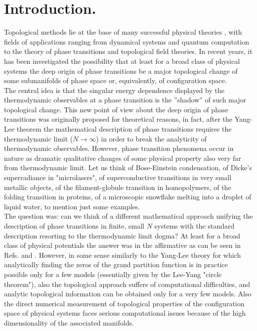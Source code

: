 \documentclass[preprintnumbers,showpacs, showkeys, twocolumn,secnumarabic,amssymb,amsmath,amsfonts,aps, pre]{revtex4-1}
\begin{document}
\section{Introduction. }
Topological methods lie at the base of many successful physical theories \cite{Nakahara}, with fields of applications ranging from dynamical systems and quantum computation to the theory of phase transitions and topological field theories. 
In recent years, it has been investigated \cite{PettiniBook} the possibility that at least for a broad class of physical systems the deep origin of phase transitions be a major topological change of some submanifolds of phase space or, equivalently, of configuration space. \\
The central idea is that the singular energy dependence displayed by the thermodynamic observables at a phase transition is the ”shadow” of such major topological change. 
This new point of view about 
the deep origin of phase transitions was originally proposed for theoretical reasons, in fact, after the Yang-Lee theorem the mathematical description of phase transitions requires the thermodynamic limit ($N\rightarrow\infty$) in order to break the analyticity of thermodynamic observables. However, phase transition phenomena occur in nature as dramatic qualitative changes of some physical property also very far from thermodynamic limit. Let us think of Bose-Einstein condensation, of Dicke's superradiance in "microlasers", of superconductive transitions in very small metallic objects, of the filament-globule transition in homopolymers, of the folding transition in proteins, of a microscopic snowflake melting into a droplet of liquid water, to mention just some examples. \\
The question was: can we think of a different mathematical approach unifying the description of phase transitions in finite, small $N$ systems with the standard description resorting to the thermodynamic limit dogma? At least for a broad class of physical potentials the answer was in the affirmative as can be seen in Refs.  \cite{PettiniBook}  and \cite{TH1,TH2}. 
However, in some sense similarly to the Yang-Lee theory for which analytically finding the zeros of the grand partition function is in practice possible only for a few models (essentially given by the Lee-Yang "circle theorem"), also the topological approach suffers of computational difficulties, and analytic
topological information can be obtained  only for a very few models.
Also the direct numerical measurement of topological properties of the configuration space of physical systems faces serious computational issues because of the high dimensionality of the associated manifolds.
\end{document}
